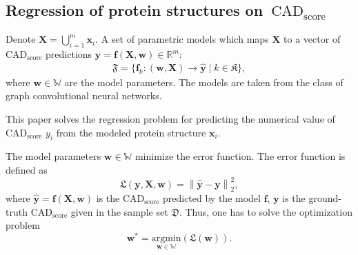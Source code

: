 \documentclass[12pt,twosides]{extarticle}
\begin{document}
\subsection{Regression of protein structures on~$\text{CAD}_\text{score}$}

Denote $\mathbf{X} = \bigcup_{i=1}^m \mathbf{x}_i$. A set of parametric models which maps $\mathbf{X}$ to a vector of $\text{CAD}_\text{score}$ predictions $\hat{\mathbf{y}} = \mathbf{f} (\mathbf{X},\mathbf{w}) \in \mathbb{R}^{m}$:
\begin{align}
\mathfrak{F} = \{\mathbf{f}_k\colon(\mathbf{w}, \mathbf{X})\to  \mathbf{\hat{y}}\mid k \in \mathfrak{K}\},
\label{params_models}
\end{align} 
where $\mathbf{w} \in \mathbb{W}$ are the model parameters. The models are taken from the class of graph convolutional neural networks.

This paper solves the regression problem for predicting the numerical value of $\text{CAD}_\text{score}$  $y_i$ from the modeled protein structure $\mathbf{x}_i$.

The model parameters $\mathbf{w}\in \mathbb{W}$ minimize the error function. The error function is defined as
\[\mathfrak{L}(\mathbf{y}, \mathbf{X}, \mathbf{w}) =\left\lVert \hat{\mathbf{y}} - \mathbf{y} \right\rVert^{2}_2,\]
where $\mathbf{\hat{y}} = \mathbf{f} (\mathbf{X},\mathbf{w})$ is the $\text{CAD}_\text{score}$ predicted by the model $\mathbf{f}$, $\mathbf{y}$ is the ground-truth $\text{CAD}_\text{score}$ given in the sample set $\mathfrak{D}$.
Thus, one has to solve the optimization problem
$$\textbf{w}^* = \underset{\mathbf{w}\in\mathbb{W}}{\text{argmin}}(\mathfrak{L}(\textbf{w})).$$
\end{document}
